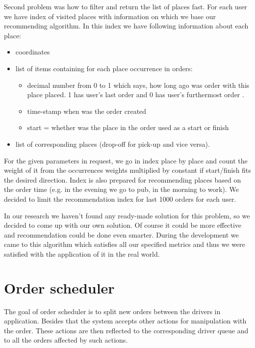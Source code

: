  Second problem was how to filter and return the list of places fast. For each user we have index of visited places with information on which we base our recommending algorithm. In this index we have following information about each place:
 \begin{itemize}
 	\item coordinates
 	\item list of items containing for each place occurrence in orders:
 	\begin{itemize}
 		\item decimal number from 0 to 1 which says, how long ago was order with this place placed. 1 has user's last order and 0 has user's furthermost order .
 		\item time-stamp when was the order created
 		\item start = whether was the place in the order used as a start or finish
 	\end{itemize}
 	\item list of corresponding places (drop-off for pick-up and vice versa).
 \end{itemize}
For the given parameters in request, we go in index place by place and count the weight of it from the occurrences weights multiplied by constant if start/finish fits the desired direction. Index is also prepared for recommending places based on the order time (e.g. in the evening we go to pub, in the morning to work). We decided to limit the recommendation index for last 1000 orders for each user.

In our research we haven't found any ready-made solution for this problem, so we decided to come up with our own solution. Of course it could be more effective and recommendation could be done even smarter. During the development we came to this algorithm which satisfies all our specified metrics and thus we were satisfied with the application of it in the real world.

\section {Order scheduler}

The goal of order scheduler is to split new orders between the drivers in application. Besides that the system accepts other actions for manipulation with the order. These actions are then reflected to the corresponding driver queue and to all the orders affected by such actions.

